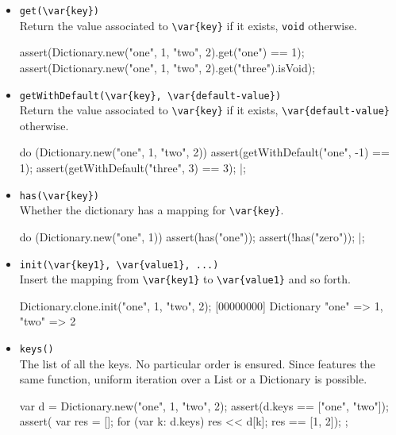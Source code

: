 \begin{itemize}
\item \lstinline|get(\var{key})|\\
  Return the value associated to  \lstinline|\var{key}| if it exists,
  \lstinline|void| otherwise.
\begin{urbiscript}[firstnumber=last]
assert(Dictionary.new("one", 1, "two", 2).get("one") == 1);
assert(Dictionary.new("one", 1, "two", 2).get("three").isVoid);
\end{urbiscript}


\item \lstinline|getWithDefault(\var{key}, \var{default-value})|\\
  Return the value associated to  \lstinline|\var{key}| if it exists,
  \lstinline|\var{default-value}| otherwise.

\begin{urbiscript}[firstnumber=last]
do (Dictionary.new("one", 1, "two", 2))
{
  assert(getWithDefault("one",  -1) == 1);
  assert(getWithDefault("three", 3) == 3);
}|;
\end{urbiscript}


\item \lstinline|has(\var{key})|\\
  Whether the dictionary has a mapping for \lstinline|\var{key}|.

\begin{urbiscript}[firstnumber=last]
do (Dictionary.new("one", 1))
{
  assert(has("one"));
  assert(!has("zero"));
}|;
\end{urbiscript}

\item \lstinline|init(\var{key1}, \var{value1}, ...)|~\\
  Insert the mapping from \lstinline|\var{key1}| to
  \lstinline|\var{value1}| and so forth.

\begin{urbiscript}[firstnumber=last]
Dictionary.clone.init("one", 1, "two", 2);
[00000000] Dictionary {"one" => 1, "two" => 2}
\end{urbiscript}

\item \lstinline|keys()|\\
  The list of all the keys.  No particular order is ensured.  Since
   features the same function, uniform iteration over
  a List or a Dictionary is possible.
\begin{urbiscript}[firstnumber=last]
{
  var d = Dictionary.new("one", 1, "two", 2);
  assert(d.keys == ["one", "two"]);
  assert({
           var res = [];
           for (var k: d.keys)
             res << d[k];
           res
         }
         == [1, 2]);
};
\end{urbiscript}


\end{itemize}
